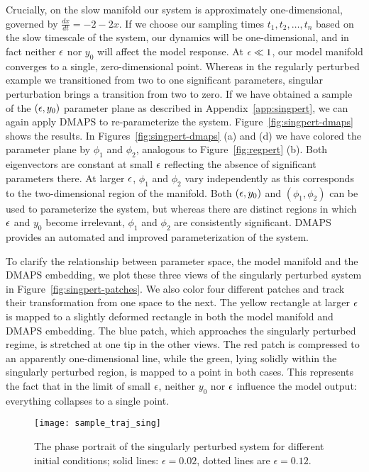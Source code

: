 Crucially, on the slow manifold our system is approximately
one-dimensional, governed by $\frac{dx}{dt} = -2 - 2x$. If we choose
our sampling times $t_1, t_2, \dots, t_n$ based on the slow timescale
of the system, our dynamics will be one-dimensional, and in fact
neither $\epsilon$ nor $y_0$ will affect the model response. At
$\epsilon \ll 1$, our model manifold converges to a single,
zero-dimensional point. Whereas in the regularly perturbed example we
transitioned from two to one significant parameters, singular
perturbation brings a transition from two to zero. If we have obtained
a sample of the $(\epsilon, y_0)$ parameter plane as described in
Appendix~\ref{app:singpert}, we can again apply DMAPS to
re-parameterize the system. Figure~\ref{fig:singpert-dmaps} shows
the results. In Figures~\ref{fig:singpert-dmaps} (a) and (d) we have
colored the parameter plane by $\phi_1$ and $\phi_2$, analogous to
Figure~\ref{fig:regpert} (b). Both eigenvectors are constant at
small $\epsilon$ reflecting the absence of significant parameters
there. At larger $\epsilon$, $\phi_1$ and $\phi_2$ vary independently as
this corresponds to the two-dimensional region of the manifold. Both
$(\epsilon, y_0)$ and $(\phi_1, \phi_2)$ can be used to parameterize the
system, but whereas there are distinct regions in which $\epsilon$ and
$y_0$ become irrelevant, $\phi_1$ and $\phi_2$ are consistently
significant. DMAPS provides an automated and improved parameterization
of the system.

To clarify the relationship between parameter space, the model
manifold and the DMAPS embedding, we plot these three views of the
singularly perturbed system in Figure~\ref{fig:singpert-patches}. We
also color four different patches and track their transformation from
one space to the next. The yellow rectangle at larger $\epsilon$ is mapped
to a slightly deformed rectangle in both the model manifold and DMAPS
embedding. The blue patch, which approaches the singularly perturbed
regime, is stretched at one tip in the other views. The red patch is
compressed to an apparently one-dimensional line, while the green,
lying solidly within the singularly perturbed region, is mapped to a
point in both cases. This represents the fact that in the limit of
small $\epsilon$, neither $y_0$ nor $\epsilon$ influence the model output:
everything collapses to a single point.

\begin{figure}[!htp]
\centering
\texttt{[image: sample\_traj\_sing]}
\caption{The phase portrait of the singularly perturbed system for
  different initial conditions; solid lines: $\epsilon=0.02$, dotted
  lines are $\epsilon=0.12$. \label{fig:singpert}}
\end{figure}

